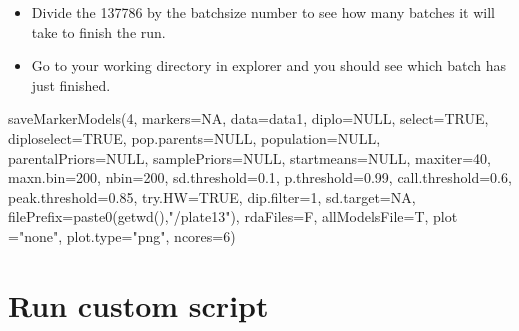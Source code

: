 \documentclass[
]{article}
\newenvironment{Shaded}{\begin{snugshade}}{\end{snugshade}}
\newcommand{\AttributeTok}[1]{\textcolor[rgb]{0.77,0.63,0.00}{#1}}
\newcommand{\ConstantTok}[1]{\textcolor[rgb]{0.00,0.00,0.00}{#1}}
\newcommand{\DecValTok}[1]{\textcolor[rgb]{0.00,0.00,0.81}{#1}}
\newcommand{\FloatTok}[1]{\textcolor[rgb]{0.00,0.00,0.81}{#1}}
\newcommand{\FunctionTok}[1]{\textcolor[rgb]{0.00,0.00,0.00}{#1}}
\newcommand{\NormalTok}[1]{#1}
\newcommand{\StringTok}[1]{\textcolor[rgb]{0.31,0.60,0.02}{#1}}
\begin{document}
\begin{itemize}
\item
  Divide the 137786 by the batchsize number to see how many batches it
  will take to finish the run.
\item
  Go to your working directory in explorer and you should see which
  batch has just finished.
\end{itemize}

\begin{Shaded}
\begin{Highlighting}[]
\FunctionTok{saveMarkerModels}\NormalTok{(}\DecValTok{4}\NormalTok{, }\AttributeTok{markers=}\ConstantTok{NA}\NormalTok{, }\AttributeTok{data=}\NormalTok{data1, }\AttributeTok{diplo=}\ConstantTok{NULL}\NormalTok{, }\AttributeTok{select=}\ConstantTok{TRUE}\NormalTok{,}
                 \AttributeTok{diploselect=}\ConstantTok{TRUE}\NormalTok{, }\AttributeTok{pop.parents=}\ConstantTok{NULL}\NormalTok{, }\AttributeTok{population=}\ConstantTok{NULL}\NormalTok{, }\AttributeTok{parentalPriors=}\ConstantTok{NULL}\NormalTok{,}
                 \AttributeTok{samplePriors=}\ConstantTok{NULL}\NormalTok{, }\AttributeTok{startmeans=}\ConstantTok{NULL}\NormalTok{, }\AttributeTok{maxiter=}\DecValTok{40}\NormalTok{, }\AttributeTok{maxn.bin=}\DecValTok{200}\NormalTok{, }\AttributeTok{nbin=}\DecValTok{200}\NormalTok{,}
                 \AttributeTok{sd.threshold=}\FloatTok{0.1}\NormalTok{, }\AttributeTok{p.threshold=}\FloatTok{0.99}\NormalTok{, }\AttributeTok{call.threshold=}\FloatTok{0.6}\NormalTok{, }\AttributeTok{peak.threshold=}\FloatTok{0.85}\NormalTok{,}
                 \AttributeTok{try.HW=}\ConstantTok{TRUE}\NormalTok{, }\AttributeTok{dip.filter=}\DecValTok{1}\NormalTok{, }\AttributeTok{sd.target=}\ConstantTok{NA}\NormalTok{,}
                 \AttributeTok{filePrefix=}\FunctionTok{paste0}\NormalTok{(}\FunctionTok{getwd}\NormalTok{(),}\StringTok{"/plate13"}\NormalTok{), }\AttributeTok{rdaFiles=}\NormalTok{F, }\AttributeTok{allModelsFile=}\NormalTok{T,}
                 \AttributeTok{plot =}\StringTok{"none"}\NormalTok{, }\AttributeTok{plot.type=}\StringTok{"png"}\NormalTok{, }\AttributeTok{ncores=}\DecValTok{6}\NormalTok{)}
\end{Highlighting}
\end{Shaded}

\hypertarget{run-custom-script}{%
\section{Run custom script}\label{run-custom-script}}
\end{document}
